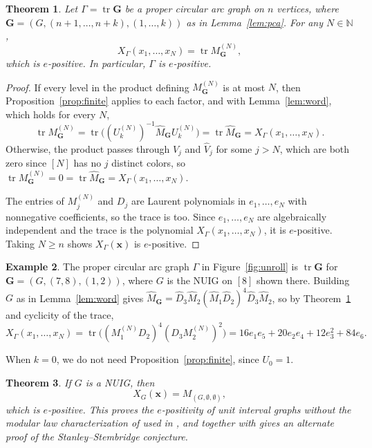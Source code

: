 \documentclass[12pt]{article}
\theoremstyle{plain}
\newtheorem{theorem}{Theorem}
\theoremstyle{definition}
\newtheorem{example}[theorem]{Example}
\theoremstyle{remark}
\newcommand{\bN}{\mathbb{N}}
\newcommand{\bG}{\mathbf{G}}
\begin{document}
\begin{theorem}\label{thm:pca}
Let $\Gamma=\operatorname{tr}\bG$ be a proper circular arc graph on $n$
vertices, where $\bG=(G,(n+1,\dots,n+k),(1,\dots,k))$ as in
Lemma~\ref{lem:pca}. For any $N\in\bN$,
\[
X_\Gamma(x_1,\dots,x_N)=\operatorname{tr}M_\bG^{(N)},
\]
which is $e$-positive. In particular, $\Gamma$ is $e$-positive.
\end{theorem}

\begin{proof}
If every level in the product defining $M_\bG^{(N)}$ is at most $N$, then
Proposition~\ref{prop:finite} applies to each factor, and with
Lemma~\ref{lem:word}, which holds for every $N$,
\[
\operatorname{tr}M_\bG^{(N)}
=\operatorname{tr}\bigl((U_k^{(N)})^{-1}\hat M_\bG U_k^{(N)}\bigr)
=\operatorname{tr}\hat M_\bG
=X_\Gamma(x_1,\dots,x_N).
\]
Otherwise, the product passes through $V_j$ and $\hat V_j$ for some
$j>N$, which are both zero since $[N]$ has no $j$ distinct colors, so
$\operatorname{tr}M_\bG^{(N)}=0=\operatorname{tr}\hat M_\bG
=X_\Gamma(x_1,\dots,x_N)$.

The entries of $M_j^{(N)}$ and $D_j$ are Laurent polynomials in $e_1,\dots,e_N$ with nonnegative coefficients, so the trace is too. Since $e_1,\dots,e_N$ are algebraically independent and the trace is the polynomial $X_\Gamma(x_1,\dots,x_N)$, it is $e$-positive. Taking $N\ge n$ shows $X_\Gamma(\bm x)$ is $e$-positive.
\end{proof}

\begin{example}\label{ex:pca}
The proper circular arc graph $\Gamma$ in Figure~\ref{fig:unroll} is
$\operatorname{tr}\bG$ for $\bG=(G,(7,8),(1,2))$, where $G$ is the NUIG
on $[8]$ shown there. Building $G$ as in Lemma~\ref{lem:word} gives
$\hat M_\bG=\hat D_3\hat M_2(\hat M_1\hat D_2)^4\hat D_3\hat M_2$, so by
Theorem~\ref{thm:pca} and cyclicity of the trace,
\[
X_\Gamma(x_1,\dots,x_N)
=\operatorname{tr}\bigl((M_1^{(N)}D_2)^4(D_3M_2^{(N)})^2\bigr)
=16e_1e_5+20e_2e_4+12e_3^2+84e_6.
\]
\end{example}

When $k=0$, we do not need Proposition~\ref{prop:finite}, since $U_0=1$.

\begin{theorem}\label{thm:stanstem}
If $G$ is a NUIG, then
\[
X_G(\bm x)=M_{(G,\emptyset,\emptyset)},
\]
which is $e$-positive. This proves the $e$-positivity of unit interval graphs without the modular law characterization of \cite{chrommodularlaw} used in \cite{stanstemproof}, and together with \cite[Theorem 5.1]{stanstemreduction} gives an alternate proof of the Stanley--Stembridge conjecture.
\end{theorem}
\end{document}

